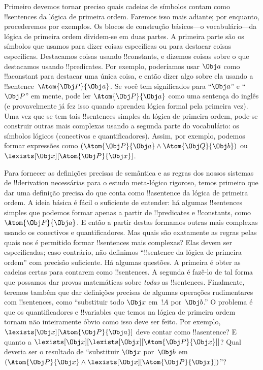 \documentclass[../../../include/open-logic-section]{subfiles}
\begin{document}


Primeiro devemos tornar preciso quais cadeias de símbolos contam como
!!{sentence}s da lógica de primeira ordem.  Faremos isso mais adiante; por
enquanto, procederemos por exemplos.  Os blocos de construção básicos---o
vocabulário---da lógica de primeira ordem dividem-se em duas partes. A
primeira parte são os símbolos que usamos para dizer coisas específicas ou
para destacar coisas específicas. Destacamos coisas usando
!!{constant}s, e dizemos coisas sobre o que destacamos usando
!!{predicate}s.  Por exemplo, poderíamos usar $\Obj a$ como
!!a{constant} para destacar uma única coisa, e então dizer algo sobre ela
usando a !!{sentence}~$\Atom{\Obj P}{\Obj a}$.  Se você tem significados
para ``$\Obj a$'' e ``$\Obj P$'' em mente, pode ler $\Atom{\Obj P}{\Obj a}$
como uma sentença do inglês (e provavelmente já fez isso quando aprendeu
lógica formal pela primeira vez).  Uma vez que se tem tais !!{sentence}s
simples da lógica de primeira ordem, pode-se construir outras mais complexas
usando a segunda parte do vocabulário: os símbolos lógicos (conectivos e
quantificadores). Assim, por exemplo, podemos formar expressões como
$(\Atom{\Obj P}{\Obj a} \land \Atom{\Obj Q}{\Obj b})$ ou
~$\lexists[\Obj x][\Atom{\Obj P}{\Obj x}]$.

Para fornecer as definições precisas de semântica e as regras dos nossos
sistemas de !!{derivation} necessárias para o estudo meta-lógico rigoroso,
temos primeiro que dar uma definição precisa do que conta como
!!a{sentence} da lógica de primeira ordem. A ideia básica é fácil o
suficiente de entender: há algumas !!{sentence}s simples que podemos formar
apenas a partir de !!{predicate}s e !!{constant}s, como~$\Atom{\Obj P}{\Obj
a}$. E então a partir destas formamos outras mais complexas usando os
conectivos e quantificadores. Mas quais são exatamente as regras pelas quais
nos é permitido formar !!{sentence}s mais complexas?  Elas devem ser
especificadas; caso contrário, não definimos ``!!{sentence} da lógica de
primeira ordem'' com precisão suficiente. Há algumas questões. A primeira
é obter as cadeias certas para contarem como !!{sentence}s. A segunda é
fazê-lo de tal forma que possamos dar provas matemáticas sobre
\emph{todas} as !!{sentence}s. Finalmente, teremos também que dar definições
precisas de algumas operações rudimentares com !!{sentence}s, como
``substituir todo $\Obj x$ em~$!A$ por~$\Obj b$.'' O problema é que os
quantificadores e !!{variable}s que temos na lógica de primeira ordem
tornam não inteiramente óbvio como isso deve ser feito. Por exemplo,
$\lexists[\Obj x][\Atom{\Obj P}{\Obj a}]$ deve contar como
!!a{sentence}? E quanto a $\lexists[\Obj x][\lexists[\Obj
x][\Atom{\Obj P}{\Obj x}]]$? Qual deveria ser o resultado de ``substituir
$\Obj x$ por~$\Obj b$ em $(\Atom{\Obj P}{\Obj x} \land \lexists[\Obj
x][\Atom{\Obj P}{\Obj x}])$''?
\end{document}

